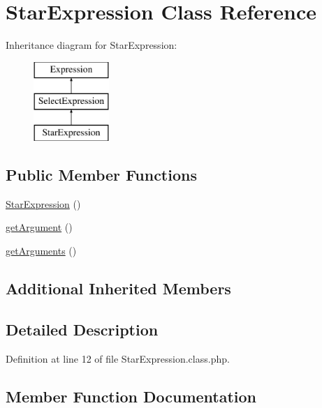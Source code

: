 \hypertarget{classStarExpression}{}\section{Star\+Expression Class Reference}
\label{classStarExpression}
Inheritance diagram for Star\+Expression\+:\begin{figure}[H]
\begin{center}
\leavevmode
\includegraphics[height=3.000000cm]{classStarExpression}
\end{center}
\end{figure}
\subsection*{Public Member Functions}
\begin{DoxyCompactItemize}
\item 
\hyperlink{classStarExpression_a7c9d934f3e104f7987f4266ef9e28eff}{Star\+Expression} ()
\item 
\hyperlink{classStarExpression_aea592d1760bbc7395f9e3e9b1f01b9a9}{get\+Argument} ()
\item 
\hyperlink{classStarExpression_ac356994bb75dacb90fd7ac6aa3dbb49c}{get\+Arguments} ()
\end{DoxyCompactItemize}
\subsection*{Additional Inherited Members}


\subsection{Detailed Description}


Definition at line 12 of file Star\+Expression.\+class.\+php.



\subsection{Member Function Documentation}
\hypertarget{classStarExpression_aea592d1760bbc7395f9e3e9b1f01b9a9}{}\label{classStarExpression_aea592d1760bbc7395f9e3e9b1f01b9a9} 
